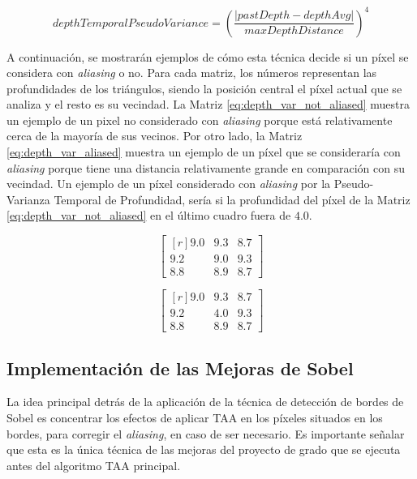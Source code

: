 \documentclass[pregrado]{tesis-usb} %
\begin{document}
\begin{equation} \label{eq:depthtemporalpseudovariance}
depthTemporalPseudoVariance = \left( \frac{\left|pastDepth-depthAvg\right|}{maxDepthDistance}\right)^4
\end{equation}

A continuación, se mostrarán ejemplos de cómo esta técnica decide si un píxel se considera con \textit{aliasing} o no. Para cada matriz, los números representan las profundidades de los triángulos, siendo la posición central el píxel actual que se analiza y el resto es su vecindad. La Matriz \ref{eq:depth_var_not_aliased} muestra un ejemplo de un pixel no considerado con \textit{aliasing} porque está relativamente cerca de la mayoría de sus vecinos. Por otro lado, la Matriz \ref{eq:depth_var_aliased} muestra un ejemplo de un píxel que se consideraría con \textit{aliasing} porque tiene una distancia relativamente grande en comparación con su vecindad. Un ejemplo de un píxel considerado con \textit{aliasing} por la Pseudo-Varianza Temporal de Profundidad, sería si la profundidad del píxel de la Matriz \ref{eq:depth_var_not_aliased} en el último cuadro fuera de $4.0$.

\begin{equation}\label{eq:depth_var_not_aliased}
\begin{bmatrix*}[r]
9.0 &  9.3 & 8.7 \\
9.2 &  9.0 & 9.3 \\
8.8 &  8.9 & 8.7
\end{bmatrix*}
\end{equation}

\begin{equation}\label{eq:depth_var_aliased}
\begin{bmatrix*}[r]
9.0 &  9.3 & 8.7 \\
9.2 &  4.0 & 9.3 \\
8.8 &  8.9 & 8.7
\end{bmatrix*}
\end{equation}

\subsection{Implementación de las Mejoras de Sobel}
La idea principal detrás de la aplicación de la técnica de detección de bordes de Sobel es concentrar los efectos de aplicar TAA en los píxeles situados en los bordes, para corregir el \textit{aliasing}, en caso de ser necesario. Es importante señalar que esta es la única técnica de las mejoras del proyecto de grado que se ejecuta antes del algoritmo TAA principal.
\end{document}
